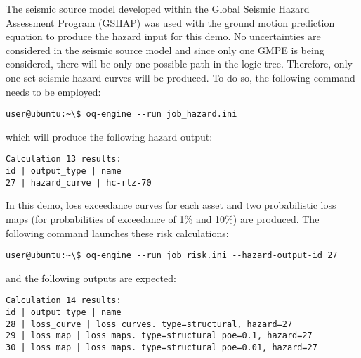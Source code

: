 The seismic source model developed within the Global Seismic Hazard Assessment
Program (GSHAP) was used with the \cite{chiou2008} ground motion prediction
equation to produce the hazard input for this demo. No uncertainties are
considered in the seismic source model and since only one GMPE is being
considered, there will be only one possible path in the logic tree. Therefore,
only one set seismic hazard curves will be produced. To do so, the following
command needs to be employed:

\begin{Verbatim}[frame=single, commandchars=\\\{\}, samepage=true]
user@ubuntu:~\$ oq-engine --run job_hazard.ini
\end{Verbatim}

which will produce the following hazard output:

\begin{Verbatim}[frame=single, commandchars=\\\{\}, samepage=true]
Calculation 13 results:
id | output_type | name
27 | hazard_curve | hc-rlz-70
\end{Verbatim}

In this demo, loss exceedance curves for each asset and two probabilistic loss
maps (for probabilities of exceedance of 1\% and 10\%) are produced. The
following command launches these risk calculations:

\begin{Verbatim}[frame=single, commandchars=\\\{\}, samepage=true]
user@ubuntu:~\$ oq-engine --run job_risk.ini --hazard-output-id 27
\end{Verbatim}

and the following outputs are expected:

\begin{Verbatim}[frame=single, commandchars=\\\{\}, samepage=true]
Calculation 14 results:
id | output_type | name
28 | loss_curve | loss curves. type=structural, hazard=27
29 | loss_map | loss maps. type=structural poe=0.1, hazard=27
30 | loss_map | loss maps. type=structural poe=0.01, hazard=27
\end{Verbatim}